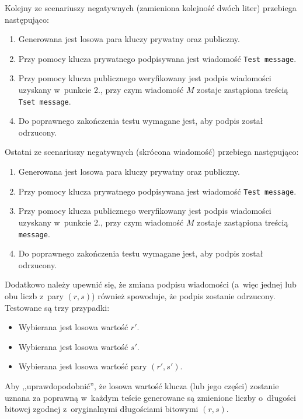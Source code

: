 \documentclass{article}
\begin{document}
        Kolejny ze scenariuszy negatywnych (zamieniona kolejność dwóch liter) przebiega następująco:
        
        \begin{enumerate}
            \item Generowana jest losowa para kluczy prywatny oraz publiczny.
            \item Przy pomocy klucza prywatnego podpisywana jest wiadomość \verb+Test message+.
            \item Przy pomocy klucza publicznego weryfikowany jest podpis wiadomości uzyskany w~punkcie 2., przy czym wiadomość $M$ zostaje zastąpiona treścią \verb+Tset message+.
            \item Do poprawnego zakończenia testu wymagane jest, aby podpis został odrzucony.
        \end{enumerate}        
        
        Ostatni ze scenariuszy negatywnych (skrócona wiadomość) przebiega następująco:
        
        \begin{enumerate}
            \item Generowana jest losowa para kluczy prywatny oraz publiczny.
            \item Przy pomocy klucza prywatnego podpisywana jest wiadomość \verb+Test message+.
            \item Przy pomocy klucza publicznego weryfikowany jest podpis wiadomości uzyskany w~punkcie 2., przy czym wiadomość $M$ zostaje zastąpiona treścią \verb+message+.
            \item Do poprawnego zakończenia testu wymagane jest, aby podpis został odrzucony.
        \end{enumerate}
        
        Dodatkowo należy upewnić się, że zmiana podpisu wiadomości (a~więc jednej lub obu liczb z~pary $(r, s)$) również spowoduje, że podpis zostanie odrzucony. Testowane są trzy przypadki:
        
        \begin{itemize}
            \item Wybierana jest losowa wartość $r'$.
            \item Wybierana jest losowa wartość $s'$.
            \item Wybierana jest losowa wartość pary $(r', s')$.
        \end{itemize}

        \noindent Aby ,,uprawdopodobnić'', że losowa wartość klucza (lub jego części) zostanie uznana za poprawną w~każdym teście generowane są zmienione liczby o~długości bitowej zgodnej z~oryginalnymi długościami bitowymi $(r, s)$.
\end{document}
